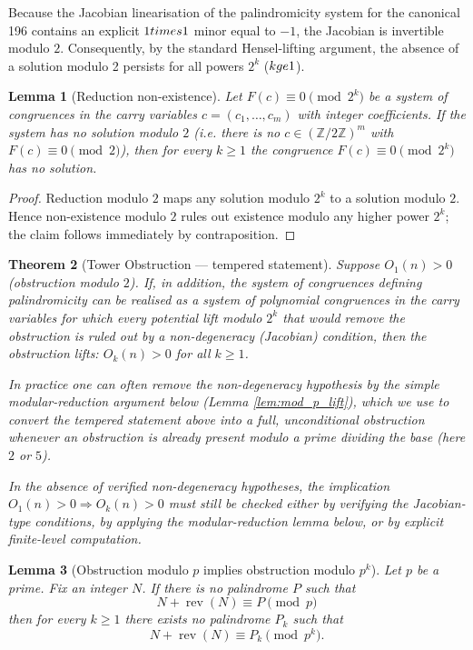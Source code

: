 \documentclass[12pt,a4paper]{article}
\newtheorem{theorem}{Theorem}[section]
\newtheorem{lemma}[theorem]{Lemma}
\begin{document}
Because the Jacobian linearisation of the palindromicity system for the canonical 196 contains an explicit $1\\times1$ minor equal to $-1$, the Jacobian is invertible modulo $2$. Consequently, by the standard Hensel-lifting argument, the absence of a solution modulo 2 persists for all powers $2^{k}$ ($k\\ge 1$).
\begin{lemma}[Reduction non-existence]
\label{lem:reduction_nonexist-6}
Let $F(c)\equiv 0\pmod{2^k}$ be a system of congruences in the carry variables $c=(c_1,\dots,c_m)$ with integer coefficients. If the system has no solution modulo $2$ (i.e. there is no $c\in(\mathbb Z/2\mathbb Z)^m$ with $F(c)\equiv0\pmod 2$), then for every $k\ge1$ the congruence $F(c)\equiv0\pmod{2^k}$ has no solution.
\end{lemma}

\begin{proof}
Reduction modulo $2$ maps any solution modulo $2^k$ to a solution modulo $2$. Hence non-existence modulo $2$ rules out existence modulo any higher power $2^k$; the claim follows immediately by contraposition.
\end{proof}

\begin{theorem}[Tower Obstruction --- tempered statement]\label{thm:tower-6}
Suppose $O_1(n) > 0$ (obstruction modulo $2$). If, in addition, the system of congruences defining palindromicity can be realised as a system of polynomial congruences in the carry variables for which every potential lift modulo $2^k$ that would remove the obstruction is ruled out by a non-degeneracy (Jacobian) condition, then the obstruction lifts: $O_k(n) > 0$ for all $k\ge 1$.

In practice one can often remove the non-degeneracy hypothesis by the simple modular-reduction argument below (Lemma \ref{lem:mod_p_lift}), which we use to convert the tempered statement above into a full, unconditional obstruction whenever an obstruction is already present modulo a prime dividing the base (here $2$ or $5$).

In the absence of verified non-degeneracy hypotheses, the implication $O_1(n)>0 \Rightarrow O_k(n)>0$ must still be checked either by verifying the Jacobian-type conditions, by applying the modular-reduction lemma below, or by explicit finite-level computation.
\end{theorem}

\begin{lemma}[Obstruction modulo $p$ implies obstruction modulo $p^k$]
\label{lem:mod_p_lift-4}
Let $p$ be a prime. Fix an integer $N$. If there is no palindrome $P$ such that
$$N+\operatorname{rev}(N)\equiv P\pmod p$$
then for every $k\ge1$ there exists no palindrome $P_k$ such that
$$N+\operatorname{rev}(N)\equiv P_k\pmod{p^k}.$$
\end{lemma}
\end{document}
